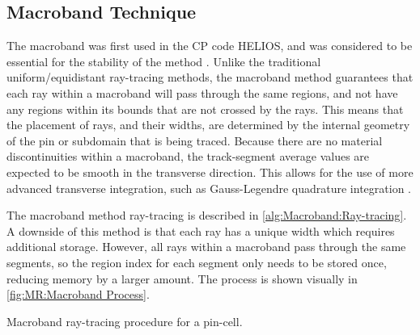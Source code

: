 {{    \subsection{Macroband Technique}{\label{ssec:MR:Macroband Technique}
      The macroband was first used in the \acf{CP} code HELIOS, and was considered to be essential for the stability of the method \cite{Villarino1992}.
      Unlike the traditional uniform/equidistant ray-tracing methods, the macroband method guarantees that each ray within a macroband will pass through the same regions, and not have any regions within its bounds that are not crossed by the rays.
      This means that the placement of rays, and their widths, are determined by the internal geometry of the pin or subdomain that is being traced.
      Because there are no material discontinuities within a macroband, the track-segment average values are expected to be smooth in the transverse direction.
      This allows for the use of more advanced transverse integration, such as Gauss-Legendre quadrature integration \cite{Yamamoto2005}.

      The macroband method ray-tracing is described in \cref{alg:Macroband:Ray-tracing}.
      A downside of this method is that each ray has a unique width which requires additional storage.
      However, all rays within a macroband pass through the same segments, so the region index for each segment only needs to be stored once, reducing memory by a larger amount.
      The process is shown visually in \cref{fig:MR:Macroband Process}.

      \begin{algorithm}[ht]
        \centering
        \caption{Macroband ray-tracing procedure for a pin-cell.\label{alg:Macroband:Ray-tracing}}
        \begin{algorithmic}[1]
          \EndFor
        \end{algorithmic}
      \end{algorithm}

}}}
